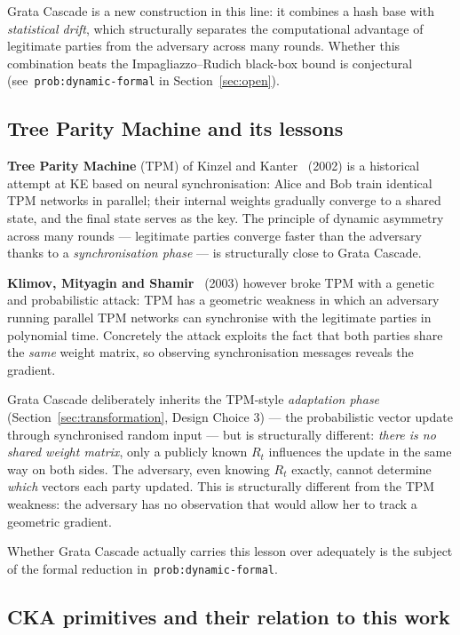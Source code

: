 \documentclass[11pt,a4paper]{article}
\begin{document}
Grata Cascade is a new construction in this line: it combines a hash base with \emph{statistical drift}, which structurally separates the computational advantage of legitimate parties from the adversary across many rounds. Whether this combination beats the Impagliazzo--Rudich black-box bound is conjectural (see~\texttt{prob:dynamic-formal} in Section~\ref{sec:open}).

\subsection{Tree Parity Machine and its lessons}\label{sec:related-tpm}

\textbf{Tree Parity Machine} (TPM) of Kinzel and Kanter~\cite{KKK2002} (2002) is a historical attempt at KE based on neural synchronisation: Alice and Bob train identical TPM networks in parallel; their internal weights gradually converge to a shared state, and the final state serves as the key. The principle of dynamic asymmetry across many rounds --- legitimate parties converge faster than the adversary thanks to a \emph{synchronisation phase} --- is structurally close to Grata Cascade.

\textbf{Klimov, Mityagin and Shamir}~\cite{KMS2003} (2003) however broke TPM with a genetic and probabilistic attack: TPM has a geometric weakness in which an adversary running parallel TPM networks can synchronise with the legitimate parties in polynomial time. Concretely the attack exploits the fact that both parties share the \emph{same} weight matrix, so observing synchronisation messages reveals the gradient.

Grata Cascade deliberately inherits the TPM-style \emph{adaptation phase} (Section~\ref{sec:transformation}, Design Choice 3) --- the probabilistic vector update through synchronised random input --- but is structurally different: \emph{there is no shared weight matrix}, only a publicly known $R_t$ influences the update in the same way on both sides. The adversary, even knowing $R_t$ exactly, cannot determine \emph{which} vectors each party updated. This is structurally different from the TPM weakness: the adversary has no observation that would allow her to track a geometric gradient.

Whether Grata Cascade actually carries this lesson over adequately is the subject of the formal reduction in~\texttt{prob:dynamic-formal}.

\subsection{CKA primitives and their relation to this work}\label{sec:related-cka}
\end{document}
